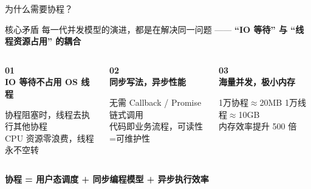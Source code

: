 \begin{frame}{为什么需要协程？}
  \begin{block}{核心矛盾}
    每一代并发模型的演进，都是在解决同一问题 —— \textcolor{corRed}{\textbf{``IO 等待'' 与 ``线程资源占用'' 的耦合}}
  \end{block}

  \vspace{0.5em}

  \begin{columns}[T]
    \begin{center}
      \textcolor{midblue}{\large\bfseries 01}\\[0.3em]
      \textbf{IO 等待不占用 OS 线程}
      \vspace{0.3em}

      {\footnotesize 协程阻塞时，线程去执行其他协程\\CPU 资源零浪费，线程永不空转}
    \end{center}

    \begin{center}
      \textcolor{midblue}{\large\bfseries 02}\\[0.3em]
      \textbf{同步写法，异步性能}
      \vspace{0.3em}

      {\footnotesize 无需 Callback / Promise 链式调用\\代码即业务流程，可读性=可维护性}
    \end{center}

    \begin{center}
      \textcolor{midblue}{\large\bfseries 03}\\[0.3em]
      \textbf{海量并发，极小内存}
      \vspace{0.3em}

      {\footnotesize 1万协程$\approx$20MB \quad 1万线程$\approx$10GB\\内存效率提升 500 倍}
    \end{center}
  \end{columns}

  \vspace{0.8em}

  \begin{exampleblock}{}
    \centering\bfseries
    协程 = 用户态调度 + 同步编程模型 + 异步执行效率
  \end{exampleblock}
\end{frame}


